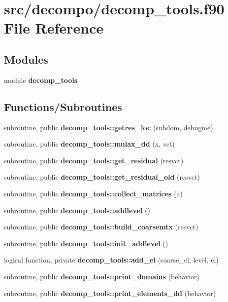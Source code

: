 \section{src/decompo/decomp\+\_\+tools.f90 File Reference}
\label{decomp__tools_8f90}
\subsection*{Modules}
\begin{DoxyCompactItemize}
\item 
module {\bf decomp\+\_\+tools}
\end{DoxyCompactItemize}
\subsection*{Functions/\+Subroutines}
\begin{DoxyCompactItemize}
\item 
subroutine, public {\bf decomp\+\_\+tools\+::getres\+\_\+loc} (subdom, debugme)
\item 
subroutine, public {\bf decomp\+\_\+tools\+::mulax\+\_\+dd} (x, vct)
\item 
subroutine, public {\bf decomp\+\_\+tools\+::get\+\_\+residual} (resvct)
\item 
subroutine, public {\bf decomp\+\_\+tools\+::get\+\_\+residual\+\_\+old} (resvct)
\item 
subroutine, public {\bf decomp\+\_\+tools\+::collect\+\_\+matrices} (a)
\item 
subroutine, public {\bf decomp\+\_\+tools\+::addlevel} ()
\item 
subroutine, public {\bf decomp\+\_\+tools\+::build\+\_\+coarsemtx} (resvct)
\item 
subroutine, public {\bf decomp\+\_\+tools\+::init\+\_\+addlevel} ()
\item 
logical function, private {\bf decomp\+\_\+tools\+::add\+\_\+el} (coarse\+\_\+el, level, el)
\item 
subroutine, public {\bf decomp\+\_\+tools\+::print\+\_\+domains} (behavior)
\item 
subroutine, public {\bf decomp\+\_\+tools\+::print\+\_\+elements\+\_\+dd} (behavior)
\end{DoxyCompactItemize}
